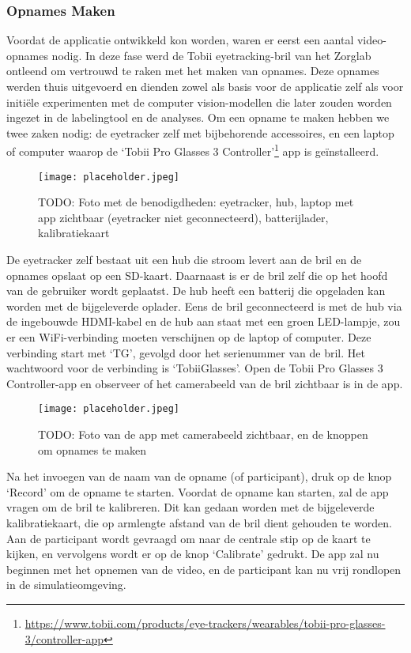 \subsubsection{Opnames Maken}

Voordat de applicatie ontwikkeld kon worden, waren er eerst een aantal video-opnames nodig. 
In deze fase werd de Tobii eyetracking-bril van het Zorglab ontleend om vertrouwd te raken met het maken van opnames. 
Deze opnames werden thuis uitgevoerd en dienden zowel als basis voor de applicatie zelf als voor initiële experimenten met de computer vision-modellen die later zouden worden ingezet in de labelingtool en de analyses.
Om een opname te maken hebben we twee zaken nodig: de eyetracker zelf met bijbehorende accessoires, en een laptop of computer waarop de `Tobii Pro Glasses 3 Controller'\footnote{\url{https://www.tobii.com/products/eye-trackers/wearables/tobii-pro-glasses-3/controller-app}} app is geïnstalleerd.

\begin{figure}[H]
  \centering
  \texttt{[image: placeholder.jpeg]}
  \caption[]{\label{fig:todo} TODO: Foto met de benodigdheden: eyetracker, hub, laptop met app zichtbaar (eyetracker niet geconnecteerd), batterijlader, kalibratiekaart
 }
\end{figure}

De eyetracker zelf bestaat uit een hub die stroom levert aan de bril en de opnames opslaat op een SD-kaart. Daarnaast is er de bril zelf die op het hoofd van de gebruiker wordt geplaatst.
De hub heeft een batterij die opgeladen kan worden met de bijgeleverde oplader. 
Eens de bril geconnecteerd is met de hub via de ingebouwde HDMI-kabel en de hub aan staat met een groen LED-lampje, zou er een WiFi-verbinding moeten verschijnen op de laptop of computer.
Deze verbinding start met `TG', gevolgd door het serienummer van de bril. Het wachtwoord voor de verbinding is `TobiiGlasses'. 
Open de Tobii Pro Glasses 3 Controller-app en observeer of het camerabeeld van de bril zichtbaar is in de app.

\begin{figure}[H]
  \centering
  \texttt{[image: placeholder.jpeg]}
  \caption[]{\label{fig:todo} TODO: Foto van de app met camerabeeld zichtbaar, en de knoppen om opnames te maken
 }
\end{figure}

Na het invoegen van de naam van de opname (of participant), druk op de knop `Record' om de opname te starten.
Voordat de opname kan starten, zal de app vragen om de bril te kalibreren. 
Dit kan gedaan worden met de bijgeleverde kalibratiekaart, die op armlengte afstand van de bril dient gehouden te worden.
Aan de participant wordt gevraagd om naar de centrale stip op de kaart te kijken, en vervolgens wordt er op de knop `Calibrate' gedrukt.
De app zal nu beginnen met het opnemen van de video, en de participant kan nu vrij rondlopen in de simulatieomgeving.

